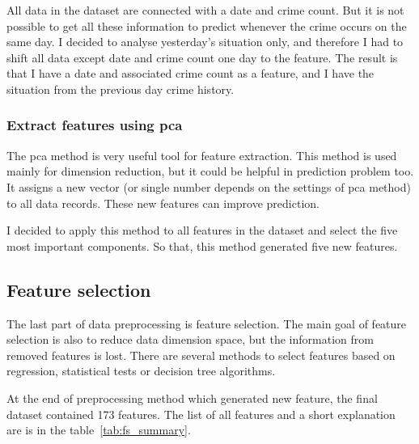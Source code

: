 \documentclass[thesis=M,english]{FITthesis}[2012/10/20]
\begin{document}
All data in the dataset are connected with a date and crime count. But it is not possible to get all these information to predict whenever the crime occurs on the same day. I decided to analyse yesterday's situation only, and therefore I had to shift all data except date and crime count one day to the feature. The result is that I have a date and associated crime count as a feature, and I have the situation from the previous day crime history.  

\subsubsection{Extract features using \gls{pca}}

The \gls{pca} method is very useful tool for feature extraction. This method is used mainly for dimension reduction, but it could be helpful in prediction problem too. It assigns a new vector (or single number depends on the settings of \gls{pca} method) to all data records. These new features can improve prediction.

I decided to apply this method to all features in the dataset and select the five most important components. So that, this method generated five new features.


\subsection{Feature selection}\label{sec:feature_selection}

The last part of data preprocessing is feature selection. The main goal of feature selection is also to reduce data dimension space, but the information from removed features is lost. There are several methods to select features based on regression, statistical tests or decision tree algorithms. 

At the end of preprocessing method which generated new feature, the final dataset contained 173 features. The list of all features and a short explanation are is in the table~\ref{tab:fs_summary}.
\end{document}
